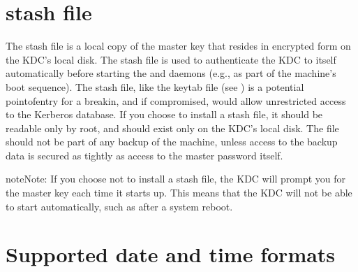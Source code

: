 \documentclass[letterpaper,10pt,english]{sphinxmanual}
\begin{document}
\sphinxstepscope


\chapter{stash file}
\label{\detokenize{basic/stash_file_def:stash-file}}\label{\detokenize{basic/stash_file_def:stash-definition}}\label{\detokenize{basic/stash_file_def::doc}}
\sphinxAtStartPar
The stash file is a local copy of the master key that resides in
encrypted form on the KDC’s local disk.  The stash file is used to
authenticate the KDC to itself automatically before starting the
 and  daemons (e.g., as part of the
machine’s boot sequence).  The stash file, like the keytab file (see
) is a potential point\sphinxhyphen{}of\sphinxhyphen{}entry for a break\sphinxhyphen{}in, and
if compromised, would allow unrestricted access to the Kerberos
database.  If you choose to install a stash file, it should be
readable only by root, and should exist only on the KDC’s local disk.
The file should not be part of any backup of the machine, unless
access to the backup data is secured as tightly as access to the
master password itself.

\begin{sphinxadmonition}{note}{Note:}
\sphinxAtStartPar
If you choose not to install a stash file, the KDC will prompt you for the master key each time it starts up.
This means that the KDC will not be able to start automatically, such as after a system reboot.
\end{sphinxadmonition}

\sphinxstepscope


\chapter{Supported date and time formats}
\label{\detokenize{basic/date_format:supported-date-and-time-formats}}\label{\detokenize{basic/date_format:datetime}}\label{\detokenize{basic/date_format::doc}}
\end{document}
